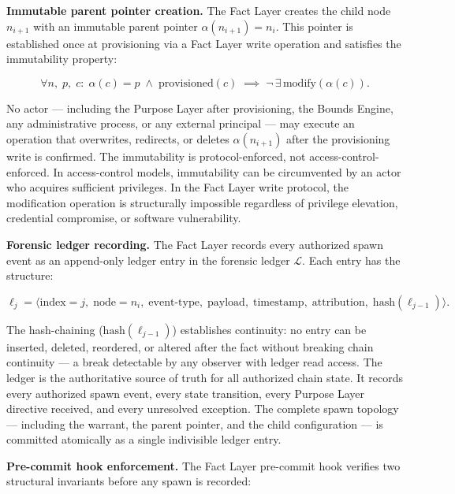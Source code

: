 \medskip
\noindent\textbf{Immutable parent pointer creation.} The Fact Layer creates the child node $n_{i+1}$ with an immutable parent pointer $\alpha(n_{i+1}) = n_i$. This pointer is established once at provisioning via a Fact Layer write operation and satisfies the immutability property:

\begin{equation}
\forall n,\; p,\; c:\;
\alpha(c) = p \;\land\; \text{provisioned}(c)
\;\implies\;
\neg\,\exists\,\text{modify}(\alpha(c)).
\label{eq:pointer-immutability}
\end{equation}

No actor — including the Purpose Layer after provisioning, the Bounds Engine, any administrative process, or any external principal — may execute an operation that overwrites, redirects, or deletes $\alpha(n_{i+1})$ after the provisioning write is confirmed. The immutability is protocol-enforced, not access-control-enforced. In access-control models, immutability can be circumvented by an actor who acquires sufficient privileges. In the Fact Layer write protocol, the modification operation is structurally impossible regardless of privilege elevation, credential compromise, or software vulnerability.

\medskip
\noindent\textbf{Forensic ledger recording.} The Fact Layer records every authorized spawn event as an append-only ledger entry in the forensic ledger $\mathcal{L}$. Each entry has the structure:

\begin{equation}
\ell_j = \bigl\langle
\text{index}=j,\;
\text{node}=n_i,\;
\text{event-type},\;
\text{payload},\;
\text{timestamp},\;
\text{attribution},\;
\text{hash}(\ell_{j-1})
\bigr\rangle .
\label{eq:ledger-entry}
\end{equation}

The hash-chaining ($\text{hash}(\ell_{j-1})$) establishes continuity: no entry can be inserted, deleted, reordered, or altered after the fact without breaking chain continuity — a break detectable by any observer with ledger read access. The ledger is the authoritative source of truth for all authorized chain state. It records every authorized spawn event, every state transition, every Purpose Layer directive received, and every unresolved exception. The complete spawn topology — including the warrant, the parent pointer, and the child configuration — is committed atomically as a single indivisible ledger entry.

\medskip
\noindent\textbf{Pre-commit hook enforcement.} The Fact Layer pre-commit hook verifies two structural invariants before any spawn is recorded:

